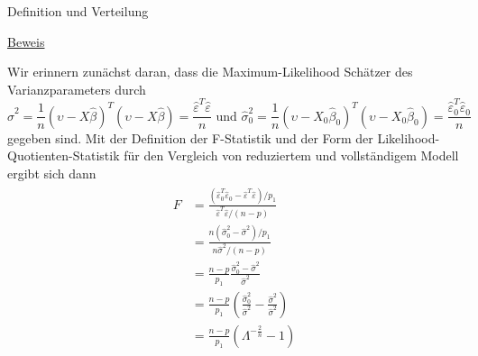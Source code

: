 \documentclass[
  8pt,
  ignorenonframetext,
]{beamer}
\begin{document}
\begin{frame}{Definition und Verteilung}
\protect\hypertarget{definition-und-verteilung-3}{}
\footnotesize

\underline{Beweis}

Wir erinnern zunächst daran, dass die Maximum-Likelihood Schätzer des
Varianzparameters durch \begin{equation}
\hat{\sigma}^2 = \frac{1}{n}\left(\upsilon - X\hat{\beta}\right)^T\left(\upsilon - X\hat{\beta}\right) = \frac{\hat{\varepsilon}^T\hat{\varepsilon}}{n}
\mbox{ und }
\hat{\sigma}^2_0 = \frac{1}{n}\left(\upsilon - X_0\hat{\beta}_0\right)^T\left(\upsilon - X_0\hat{\beta}_0\right) = \frac{\hat{\varepsilon}^T_0\hat{\varepsilon}_0}{n}
\end{equation} gegeben sind. Mit der Definition der F-Statistik und der
Form der Likelihood-Quotienten-Statistik für den Vergleich von
reduziertem und vollständigem Modell ergibt sich dann \begin{align}
\begin{split}
F 
& = \frac{(\hat{\varepsilon}_0^T\hat{\varepsilon}_0 - \hat{\varepsilon}^T\hat{\varepsilon})/p_1}{\hat{\varepsilon}^T\hat{\varepsilon}/(n-p)} \\
& = \frac{n(\hat{\sigma}^2_0 - \hat{\sigma}^2)/p_1}{n\hat{\sigma}^2/(n-p)} \\
& = \frac{n-p}{p_1} \frac{\hat{\sigma}^2_0 - \hat{\sigma}^2 }{\hat{\sigma}^2} \\
& = \frac{n-p}{p_1} \left(\frac{\hat{\sigma}^2_0}{\hat{\sigma}^2} - \frac{\hat{\sigma}^2}{\hat{\sigma}^2} \right)  \\
& = \frac{n-p}{p_1} \left(\Lambda^{-\frac{2}{n}} - 1\right)
\end{split}
\end{align}
\end{frame}
\end{document}
